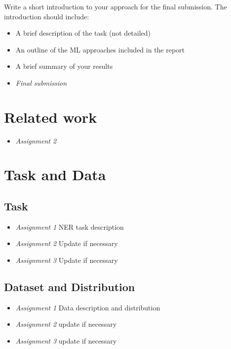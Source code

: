 \documentclass[11pt]{article}
\begin{document}
Write a short introduction to your approach for the final submission. The introduction should include:

\begin{itemize}
    \item A brief description of the task (not detailed)
    \item An outline of the ML approaches included in the report
    \item A brief summary of your results
\end{itemize}

\begin{itemize}
    \item[] \textit{Final submission} 
\end{itemize}


\section{Related work}


\begin{itemize}
    \item[] \textit{Assignment 2} 
\end{itemize}



\section{Task and Data}


\subsection{Task}



\begin{itemize}
    \item[] \textit{Assignment 1} NER task description
    \item[] \textit{Assignment 2} Update if necessary
      \item[] \textit{Assignment 3} Update if necessary
\end{itemize}

\subsection{Dataset and Distribution}



\begin{itemize}
    \item[] \textit{Assignment 1} Data description and distribution
    \item[] \textit{Assignment 2} update if necessary
     \item[] \textit{Assignment 3} update if necessary
\end{itemize}
\end{document}
